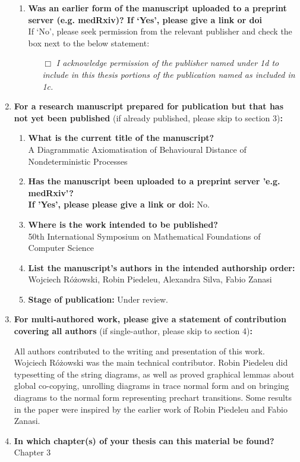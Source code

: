 \begin{enumerate}
\begin{enumerate}
			\item \textbf{Was an earlier form of the manuscript uploaded to a preprint server (e.g. medRxiv)? If ‘Yes’, please give a link or doi}
			\\
			If ‘No’, please seek permission from the relevant publisher and check the box next to the below statement:
%			
			\begin{itemize}\itemsep0em
				\item[$\Box$] {\itshape I acknowledge permission of the publisher named under 1d to include in this thesis portions of the publication named as included in 1c.}
			\end{itemize}
%		
		\end{enumerate}
%	
		\item \textbf{For a research manuscript prepared for publication but that has not yet been published} (if already published, please skip to section 3)\textbf{:}
%		
		\begin{enumerate}\itemsep0em
			\item \textbf{What is the current title of the manuscript?}\\
			A Diagrammatic Axiomatisation of Behavioural Distance of Nondeterministic Processes
			\item \textbf{Has the manuscript been uploaded to a preprint server 'e.g. medRxiv'? 
			\\
			If 'Yes', please please give a link or doi:}
			No.
			\item \textbf{Where is the work intended to be published?}\\
			50th International Symposium on Mathematical Foundations of Computer Science
			\item \textbf{List the manuscript's authors in the intended authorship order:}
			Wojciech R\'{o}\.{z}owski, Robin Piedeleu, Alexandra Silva, Fabio Zanasi
			\item \textbf{Stage of publication:}
			Under review.
		\end{enumerate}
		
		\item \textbf{For multi-authored work, please give a statement of contribution covering all authors} (if single-author, please skip to section 4)\textbf{:}
		
		All authors  contributed to the writing and presentation of this work.
		Wojciech R\'{o}\.{z}owski was the main technical contributor. Robin Piedeleu did typesetting of the string diagrams, as well as proved graphical lemmas about global co-copying, unrolling diagrams in trace normal form and on bringing diagrams to the normal form representing prechart transitions. Some results in the paper were inspired by the earlier work of Robin Piedeleu and Fabio Zanasi.


		\item \textbf{In which chapter(s) of your thesis can this material be found?}\\
		Chapter 3
	\end{enumerate}

